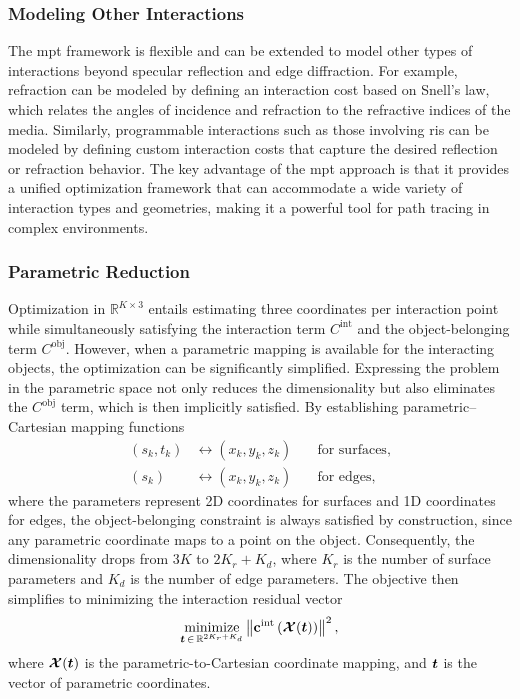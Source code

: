 \subsubsection{Modeling Other Interactions}

The \gls{mpt} framework is flexible and can be extended to model other types of interactions beyond specular reflection and edge diffraction. For example, refraction can be modeled by defining an interaction cost based on Snell's law, which relates the angles of incidence and refraction to the refractive indices of the media. Similarly, programmable interactions such as those involving \gls{ris} can be modeled by defining custom interaction costs that capture the desired reflection or refraction behavior. The key advantage of the \gls{mpt} approach is that it provides a unified optimization framework that can accommodate a wide variety of interaction types and geometries, making it a powerful tool for path tracing in complex environments.

\subsubsection{Parametric Reduction}

Optimization in $\mathbb{R}^{K \times 3}$ entails estimating three coordinates per interaction point while simultaneously satisfying the interaction term $C^{\mathrm{int}}$ and the object-belonging term $C^{\mathrm{obj}}$. However, when a parametric mapping is available for the interacting objects, the optimization can be significantly simplified. Expressing the problem in the parametric space not only reduces the dimensionality but also eliminates the $C^{\mathrm{obj}}$ term, which is then implicitly satisfied. By establishing parametric--Cartesian mapping functions
\begin{align}
  (s_k, t_k) &\leftrightarrow (x_k, y_k, z_k) \quad &\text{for surfaces}, \\
  (s_k) &\leftrightarrow (x_k, y_k, z_k) \quad &\text{for edges},
\end{align}
where the parameters represent 2D coordinates for surfaces and 1D coordinates for edges, the object-belonging constraint is always satisfied by construction, since any parametric coordinate maps to a point on the object. Consequently, the dimensionality drops from $3K$ to $2K_r + K_d$, where $K_r$ is the number of surface parameters and $K_d$ is the number of edge parameters. The objective then simplifies to minimizing the interaction residual vector
\begin{equation}\label{eq:mpt-min-param}
  \underset{\boldsymbol{t}\,\in\,\mathbb{R}^{2K_r + K_d}}{\text{minimize}} \left\|\mathbf{c}^\mathrm{int}\left(\boldsymbol{\mathcal{X}}(\boldsymbol{t})\right)\right\|^2,
\end{equation}
where $\boldsymbol{\mathcal{X}}(\boldsymbol{t})$ is the parametric-to-Cartesian coordinate mapping, and $\boldsymbol{t}$ is the vector of parametric coordinates.

